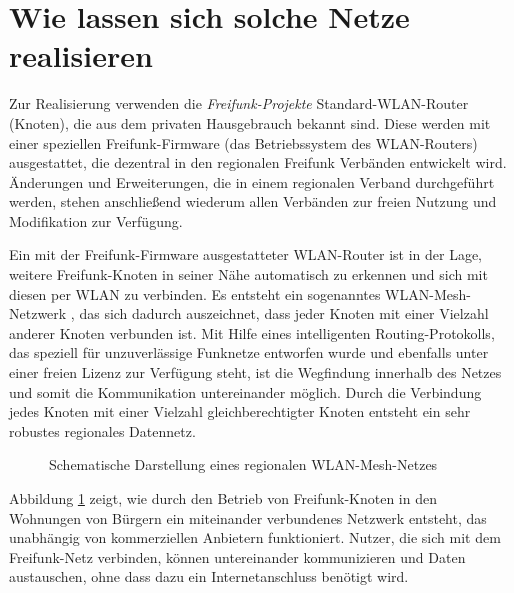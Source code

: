 \documentclass[ngerman]{article}
\begin{document}
\section*{Wie lassen sich solche Netze realisieren} 

Zur Realisierung verwenden die \textit{Freifunk-Projekte} Standard-WLAN-Router (Knoten), die aus dem privaten Hausgebrauch bekannt sind.
Diese werden mit einer speziellen Freifunk-Firmware (das Betriebssystem des WLAN-Routers) ausgestattet, die dezentral in den regionalen Freifunk Verbänden entwickelt wird.
Änderungen und Erweiterungen, die in einem regionalen Verband durchgeführt werden, stehen anschließend wiederum allen Verbänden zur freien Nutzung und Modifikation zur Verfügung.

Ein mit der Freifunk-Firmware ausgestatteter WLAN-Router ist in der Lage, weitere Freifunk-Knoten in seiner Nähe automatisch zu erkennen und sich mit diesen per WLAN zu verbinden.
Es entsteht ein sogenanntes WLAN-Mesh-Netzwerk \cite{wlan-mesh}, das sich dadurch auszeichnet, dass jeder Knoten mit einer Vielzahl anderer Knoten verbunden ist.
Mit Hilfe eines intelligenten Routing-Protokolls, das speziell für unzuverlässige Funknetze entworfen wurde und ebenfalls unter einer freien Lizenz zur Verfügung steht, ist die Wegfindung innerhalb des Netzes und somit die Kommunikation untereinander möglich.
Durch die Verbindung jedes Knoten mit einer Vielzahl gleichberechtigter Knoten entsteht ein sehr robustes regionales Datennetz.

\begin{figure}[h]
	\centering
	\caption{Schematische Darstellung eines regionalen WLAN-Mesh-Netzes}
	\label{fig:freifunkwolke}
\end{figure}

Abbildung \ref{fig:freifunkwolke} zeigt, wie durch den Betrieb von Freifunk-Knoten in den Wohnungen von Bürgern ein miteinander verbundenes Netzwerk entsteht, das unabhängig von kommerziellen Anbietern funktioniert.
Nutzer, die sich mit dem Freifunk-Netz verbinden, können untereinander kommunizieren und Daten austauschen, ohne dass dazu ein Internetanschluss benötigt wird.
\end{document}
